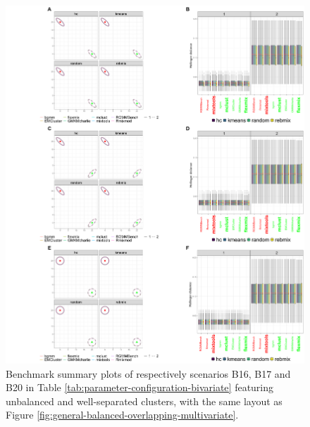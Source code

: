 \begin{figure}

{\centering \includegraphics[width=1\linewidth]{figs/multivariate/multivariate_unbalanced_well_separated} 

}

\caption{Benchmark summary plots of respectively scenarios B16, B17 and B20 in Table \ref{tab:parameter-configuration-bivariate} featuring unbalanced and well-separated clusters, with the same layout as Figure \ref{fig:general-balanced-overlapping-multivariate}.}\label{fig:general-unbalanced-well-separated-multivariate}
\end{figure}

